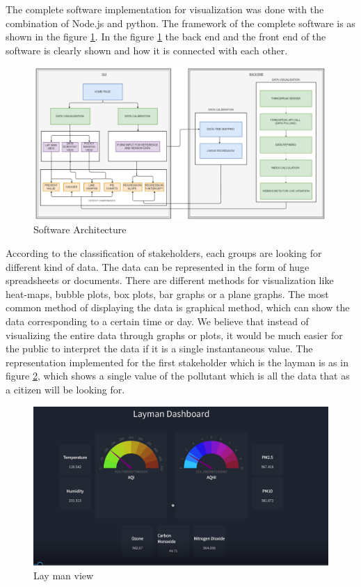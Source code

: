 The complete software implementation for visualization was done with the combination of Node.js and python. The framework of the complete software is as shown in the figure \ref{frameworksoft}. In the figure \ref{frameworksoft} the back end and the front end of the software is clearly shown and how it is connected with each other.
\begin{figure}[h]
  \begin{center}
  \includegraphics[scale=0.58]{./images/figure33.png}
  \end{center}
  \caption{Software Architecture}
  \label{frameworksoft}
\end{figure}




According to the classification of stakeholders, each groups are looking for different kind of data. The data can be represented in the form of huge spreadsheets or documents. There are different methods for visualization like heat-maps, bubble plots, box plots, bar graphs or a plane graphs. The most common method of displaying the data is graphical method, which can show the data corresponding to a certain time or day. We believe that instead of visualizing the entire data through graphs or plots, it would be much easier for the public to interpret the data if it is a single instantaneous value. The  representation implemented for the first stakeholder which is the layman is as in figure \ref{view1}, which shows a single value of the pollutant which is all the data that as a citizen will be looking for.

\begin{figure}[h]
  \begin{center}
  \includegraphics[scale=0.55]{./images/figure14.png}
  \end{center}
  \caption{Lay man view}
  \label{view1}
\end{figure}

